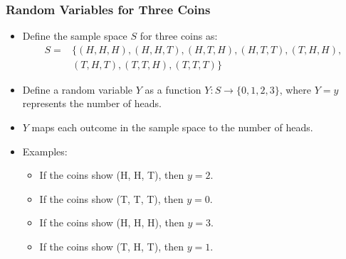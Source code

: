 \documentclass[handout]{beamer} %
\begin{document}
\begin{frame}
    \frametitle{Random Variables for Three Coins}
    \begin{itemize}
        \item Define the sample space \( S \) for three coins as: \pause
        \begin{align*}
        S =& \big\{ (H, H, H), (H, H, T), (H, T, H), (H, T, T), (T, H, H),  \\
        & (T, H, T), (T, T, H), (T, T, T) \big\}
        \end{align*}  
        \vspace{-1.7em}
        \pause
        \item Define a random variable \( Y \) as a function \( Y: S \rightarrow \{0, 1, 2, 3\} \), where \( Y=y \) represents the number of heads. \pause
        \item \( Y \) maps each outcome in the sample space to the number of heads. \pause
        \item Examples: \pause
        \begin{itemize}
            \item If the coins show (H, H, T), then \( y = 2 \). \pause
            \item If the coins show (T, T, T), then \( y = 0 \). \pause
            \item If the coins show (H, H, H), then \( y = 3 \). \pause
            \item If the coins show (T, H, T), then \( y = 1 \). 
        \end{itemize}
    \end{itemize}
\end{frame}
\end{document}

